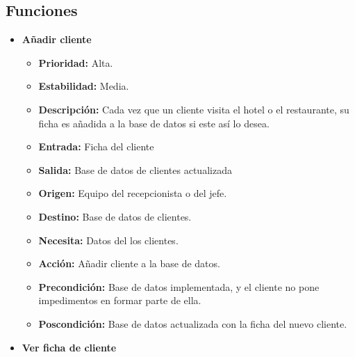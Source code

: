 \documentclass[spanish,a4paper,12pt]{report}		%
\begin{document}

\subsection{Funciones}

	\begin{itemize}%

		
		\item \textbf{Añadir cliente}  %

			\begin{itemize}
			\item \textbf{Prioridad: }Alta.
			\item \textbf{Estabilidad: }Media.
			\item \textbf{Descripción: }Cada vez que un cliente visita el hotel o el restaurante, su ficha es añadida a la base de datos si este así lo desea.
			\item \textbf{Entrada: } Ficha del cliente
			\item \textbf{Salida: }Base de datos de clientes actualizada
			\item \textbf{Origen: }Equipo del recepcionista o del jefe.
			\item \textbf{Destino: }Base de datos de clientes. 
			\item \textbf{Necesita: }Datos del los clientes. 
			\item \textbf{Acción: }Añadir cliente a la base de datos.
			\item \textbf{Precondición: }Base de datos implementada, y el cliente no pone impedimentos en formar parte de ella.
			\item \textbf{Poscondición: }Base de datos actualizada con la ficha del nuevo cliente. 


		\end{itemize}%

		\item \textbf{Ver ficha de cliente}%


\end{itemize}
\end{document}

